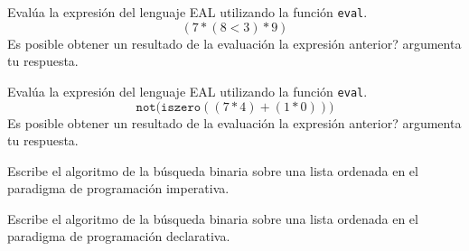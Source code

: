     \begin{exercise}
        Evalúa la expresión del lenguaje \textsf{EAL} utilizando la función \texttt{eval}. \\ 
        $$(7 * (8 < 3) * 9)$$
	  Es posible obtener un resultado de la evaluación la expresión anterior? argumenta tu respuesta.
    \end{exercise}


    \begin{exercise}
        Evalúa la expresión del lenguaje \textsf{EAL} utilizando la función \texttt{eval}. \\ 
            $$\texttt{not(iszero}( (7 * 4) + (1 * 0)))$$
 Es posible obtener un resultado de la evaluación la expresión anterior? argumenta tu respuesta.
    \end{exercise}


    \begin{exercise}
        Escribe el algoritmo de la búsqueda binaria sobre una lista ordenada en el paradigma de programación imperativa.
    \end{exercise}

    \begin{exercise}
        Escribe el algoritmo de la búsqueda binaria sobre una lista ordenada en el paradigma de programación declarativa.
    \end{exercise}



